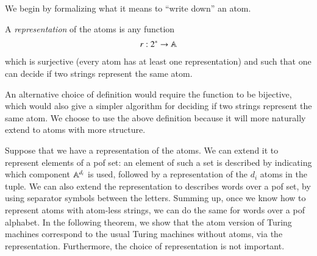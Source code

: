 We begin by formalizing what it means to ``write down'' an atom.



\begin{definition}\label{def:representation-equality}
    A \emph{representation} of the atoms is any function 
    \begin{align*}
    r : 2^* \to \mathbb A
    \end{align*}
    which is surjective (every atom has at least one representation) and such that one can decide if two strings represent the same atom.
\end{definition}

An alternative choice of definition would require the function to be bijective, which would also give a simpler algorithm for deciding if two strings represent the same atom. We choose to use the above definition because it will more naturally extend to atoms with more structure.

Suppose that we have a representation of the atoms. We can extend  it to represent elements of a pof set: an element of such a set is described by indicating which component $\mathbb A^{d_i}$ is used,  followed by a representation of the $d_i$ atoms  in the tuple. We can also extend the representation to describes words over a pof set, by using separator symbols between the letters. Summing up, once we know how to represent atoms with atom-less strings, we can do the same for words over a pof alphabet.  In the following theorem, we show that the atom version of Turing machines correspond to the usual Turing machines without atoms, via the representation. Furthermore, the choice of  representation is not important. 

